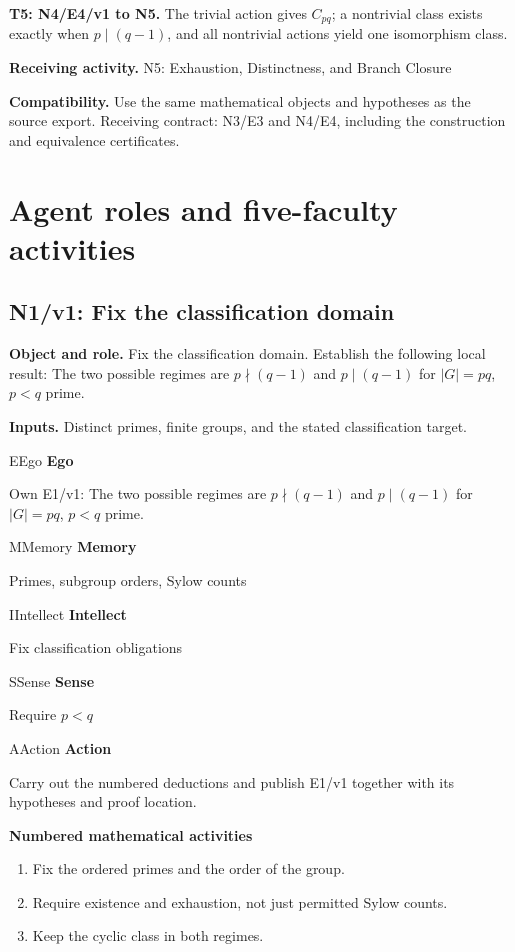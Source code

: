 \documentclass[preprint,12pt,aps,pra,showkeys,amsmath,amssymb,superscriptaddress,floatfix]{revtex4-2}
\theoremstyle{definition}
\theoremstyle{remark}
\newcommand{\mmfaculty}[3]{%
 \begin{mmfacultybox}{#1}{#2}
 {\sffamily\bfseries\color{MMBlue}#2}\par\smallskip #3
 \end{mmfacultybox}}
\newcommand{\field}[2]{\par\smallskip\noindent\textbf{#1.} #2\par}
\begin{document}
\field{T5: N4/E4/v1 to N5}{The trivial action gives \(C_{pq}\); a nontrivial class exists exactly
when \(p\mid(q-1)\), and all nontrivial actions yield one isomorphism
class.}

\field{Receiving activity}{N5: Exhaustion, Distinctness, and Branch Closure}

\field{Compatibility}{Use the same mathematical objects and hypotheses as the source export.
Receiving contract: N3/E3 and N4/E4, including the construction and
equivalence certificates.}

\endgroup

\clearpage\section{Agent roles and five-faculty activities}\begingroup\small\linespread{1.05}\selectfont{}

\subsection{N1/v1: Fix the classification domain}

\field{Object and role}{Fix the classification domain. Establish the following local result: The
two possible regimes are \(p\nmid(q-1)\) and \(p\mid(q-1)\) for
\(|G|=pq\), \(p<q\) prime.}

\field{Inputs}{Distinct primes, finite groups, and the stated classification target.}

\mmfaculty{E}{Ego}{Own E1/v1: The two possible regimes are \(p\nmid(q-1)\) and
\(p\mid(q-1)\) for \(|G|=pq\), \(p<q\) prime.}

\mmfaculty{M}{Memory}{Primes, subgroup orders, Sylow counts}

\mmfaculty{I}{Intellect}{Fix classification obligations}

\mmfaculty{S}{Sense}{Require \(p<q\)}

\mmfaculty{A}{Action}{Carry out the numbered deductions and publish E1/v1 together with its
hypotheses and proof location.}

\smallskip\noindent\textbf{Numbered mathematical activities}

\begin{enumerate}[label=N1.\arabic*,leftmargin=3.4em]

\item Fix the ordered primes and the order of the group.

\item Require existence and exhaustion, not just permitted Sylow counts.

\item Keep the cyclic class in both regimes.

\end{enumerate}
\end{document}
